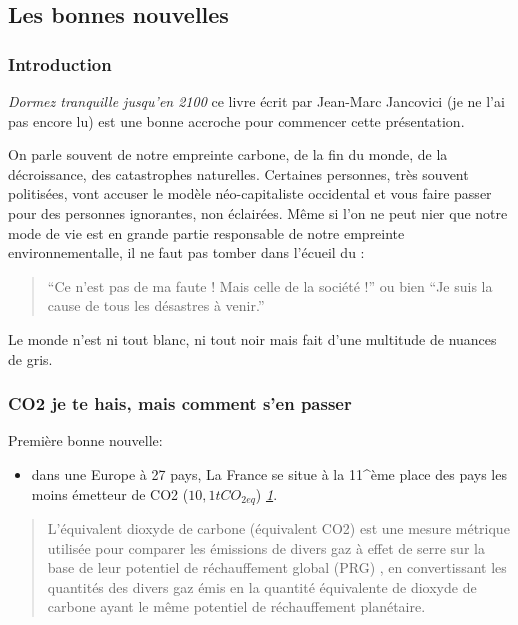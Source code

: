 \hypertarget{les-bonnes-nouvelles}{%
\subsection{Les bonnes nouvelles}\label{les-bonnes-nouvelles}}

\hypertarget{introduction}{%
\subsubsection{Introduction}\label{introduction}}

\emph{Dormez tranquille jusqu'en 2100} ce livre écrit par Jean-Marc
Jancovici (je ne l'ai pas encore lu) est une bonne accroche pour
commencer cette présentation.

On parle souvent de notre empreinte carbone, de la fin du monde, de la
décroissance, des catastrophes naturelles. Certaines personnes, très
souvent politisées, vont accuser le modèle néo-capitaliste occidental et
vous faire passer pour des personnes ignorantes, non éclairées. Même si
l'on ne peut nier que notre mode de vie est en grande partie responsable
de notre empreinte environnementalle, il ne faut pas tomber dans
l'écueil du :

\begin{quote}
``Ce n'est pas de ma faute ! Mais celle de la société !'' ou bien ``Je
suis la cause de tous les désastres à venir.''
\end{quote}

Le monde n'est ni tout blanc, ni tout noir mais fait d'une multitude de
nuances de gris.

\hypertarget{co2-je-te-hais-mais-comment-sen-passer}{%
\subsubsection{CO2 je te hais, mais comment s'en
passer}\label{co2-je-te-hais-mais-comment-sen-passer}}

Première bonne nouvelle:

\begin{itemize}
\tightlist
\item
  dans une Europe à 27 pays, La France se situe à la 11\^{}ème place des
  pays les moins émetteur de CO2 (\(10,1 tCO_{2eq}\))
  \emph{\href{https://bonpote.com/les-infographies-bon-pote/}{1}}.
\end{itemize}

\begin{quote}
L'équivalent dioxyde de carbone (équivalent CO2) est une mesure métrique
utilisée pour comparer les émissions de divers gaz à effet de serre sur
la base de leur potentiel de réchauffement global (PRG) , en
convertissant les quantités des divers gaz émis en la quantité
équivalente de dioxyde de carbone ayant le même potentiel de
réchauffement planétaire.
\end{quote}

